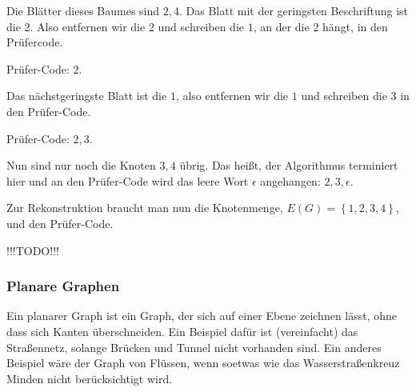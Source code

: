 \documentclass{scrartcl}
\newcommand{\TODO}{{\Huge\textcolor{HeavyRed}{\danger !!!TODO!!! \danger}}}
\begin{document}
Die Blätter dieses Baumes sind $2, 4$. Das Blatt mit der geringsten Beschriftung
ist die $2$. Also entfernen wir die $2$ und schreiben die $1$, an der die $2$ hängt,
in den Prüfercode.


Prüfer-Code: $2$.

Das nächstgeringste Blatt ist die $1$, also entfernen wir die $1$ und schreiben
die $3$ in den Prüfer-Code.


Prüfer-Code: $2, 3$.

Nun sind nur noch die Knoten $3, 4$ übrig. Das heißt, der Algorithmus terminiert hier
und an den Prüfer-Code wird das leere Wort $\epsilon$ angehangen: $2, 3, \epsilon$.

Zur Rekonstruktion braucht man nun die Knotenmenge, $E(G) = \left\{1, 2, 3, 4\right\}$, 
und den Prüfer-Code. 

\TODO

\subsubsection{Planare Graphen}

Ein planarer Graph ist ein Graph, der sich auf einer Ebene zeichnen lässt, ohne dass sich Kanten überschneiden.
Ein Beispiel dafür ist (vereinfacht) das Straßennetz, solange Brücken und Tunnel nicht vorhanden sind. Ein anderes
Beispiel wäre der Graph von Flüssen, wenn soetwas wie das Wasserstraßenkreuz Minden nicht berücksichtigt wird.
\end{document}
